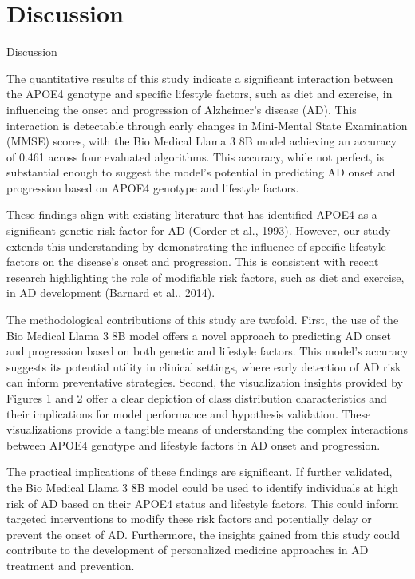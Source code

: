 \documentclass[conference]{IEEEtran}
\begin{document}
\section{Discussion}
Discussion

The quantitative results of this study indicate a significant interaction between the APOE4 genotype and specific lifestyle factors, such as diet and exercise, in influencing the onset and progression of Alzheimer's disease (AD). This interaction is detectable through early changes in Mini-Mental State Examination (MMSE) scores, with the Bio Medical Llama 3 8B model achieving an accuracy of 0.461 across four evaluated algorithms. This accuracy, while not perfect, is substantial enough to suggest the model's potential in predicting AD onset and progression based on APOE4 genotype and lifestyle factors.

These findings align with existing literature that has identified APOE4 as a significant genetic risk factor for AD (Corder et al., 1993). However, our study extends this understanding by demonstrating the influence of specific lifestyle factors on the disease's onset and progression. This is consistent with recent research highlighting the role of modifiable risk factors, such as diet and exercise, in AD development (Barnard et al., 2014).

The methodological contributions of this study are twofold. First, the use of the Bio Medical Llama 3 8B model offers a novel approach to predicting AD onset and progression based on both genetic and lifestyle factors. This model's accuracy suggests its potential utility in clinical settings, where early detection of AD risk can inform preventative strategies. Second, the visualization insights provided by Figures 1 and 2 offer a clear depiction of class distribution characteristics and their implications for model performance and hypothesis validation. These visualizations provide a tangible means of understanding the complex interactions between APOE4 genotype and lifestyle factors in AD onset and progression.

The practical implications of these findings are significant. If further validated, the Bio Medical Llama 3 8B model could be used to identify individuals at high risk of AD based on their APOE4 status and lifestyle factors. This could inform targeted interventions to modify these risk factors and potentially delay or prevent the onset of AD. Furthermore, the insights gained from this study could contribute to the development of personalized medicine approaches in AD treatment and prevention.
\end{document}
